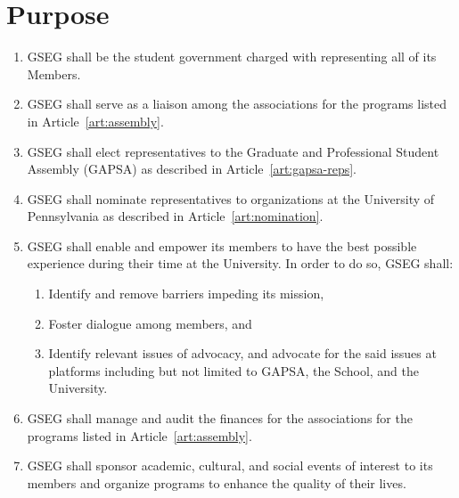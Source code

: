 \chapter{Purpose}

\begin{enumerate}[label=\Alph*.]
	\item GSEG shall be the student government charged with
	representing all of its Members. 

	\item GSEG shall serve as a liaison among the associations for the 
	programs listed in Article~\ref{art:assembly}. 

	\item GSEG shall elect representatives to the Graduate and
	Professional Student Assembly (GAPSA) as described in 
	Article~\ref{art:gapsa-reps}.

	\item GSEG shall nominate representatives to organizations at the
	University of Pennsylvania as described in Article~\ref{art:nomination}.
	
	\item GSEG shall enable and empower its members to have the best
	possible experience during their time at the University. In order
	to do so, GSEG shall:
	\begin{enumerate}[label=(\roman*)]
		\item Identify and remove barriers impeding its mission, 
		\item Foster dialogue among members, and
		\item Identify relevant issues of advocacy, and advocate for 
		the said issues at platforms including but not limited to GAPSA, 
		the School, and the University.
	\end{enumerate}
	
	\item GSEG shall manage and audit the finances for the associations
	for the programs listed in Article~\ref{art:assembly}.

	\item GSEG shall sponsor academic, cultural, and social events of interest
	to its members and organize programs to enhance the quality of their lives.
\end{enumerate}
